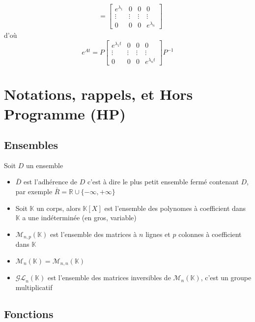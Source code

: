 \documentclass[11pt,colorlinks]{book}
\theoremstyle{mytheoremstyle}
\theoremstyle{mytheoremstyle}
\theoremstyle{mytheoremstyle}
\theoremstyle{mytheoremstyle}
\theoremstyle{mytheoremstyle}
\theoremstyle{mytheoremstyle}
\theoremstyle{mytheoremstyle}
\theoremstyle{mytheoremstyle}
\theoremstyle{myproblemstyle}
\def\mbb#1{\mathbb{#1}}
\def\mfc#1{\mathcal{#1}}
\def\bR{\mbb{R}}
\def\bK{\mbb{K}}
\begin{document}
\begin{definition}
\begin{align*}
    &= \begin{bmatrix}
      e^{\lambda_1} & 0 & 0 & 0 \\ 
      \vdots & \vdots & \vdots & \vdots \\ 
      0 & 0 & 0 & e^{\lambda_n}
    \end{bmatrix}
  \end{align*}
  d'où
  \begin{equation*}
    e^{At} = P\begin{bmatrix}
      e^{\lambda_1 t} & 0 & 0 & 0 \\ 
      \vdots & \vdots & \vdots & \vdots \\ 
      0 & 0 & 0 & e^{\lambda_n t}
    \end{bmatrix}P^{-1}
  \end{equation*}
\end{definition}
\chapter{Notations, rappels, et Hors Programme (HP)}
\section{Ensembles}
\begin{rmq}
  Soit $D$ un ensemble
  \begin{itemize}
    \item $\bar{D}$ est l'adhérence de $D$ c'est à dire le plus 
    petit ensemble fermé contenant $D$, par exemple $\bar{R} = \bR \cup \{-\infty,+\infty\}$
    \item Soit $\bK$ un corps, alors $\bK[X]$ est l'ensemble des polynomes 
    à coefficient dans $\bK$ a une indéterminée (en gros, variable)
    \item $\mfc{M}_{n,p}(\bK)$ est l'ensemble des matrices à $n$ lignes et $p$ colonnes à coefficient dans $\bK$
    \item $\mfc{M}_{n}(\bK) = \mfc{M}_{n,n}(\bK)$
    \item $\mfc{GL}_n(\bK)$ est l'ensemble des matrices inversibles de $\mfc{M}_n(\bK)$, c'est un groupe multiplicatif
  \end{itemize}
\end{rmq}
\section{Fonctions}
\end{document}
